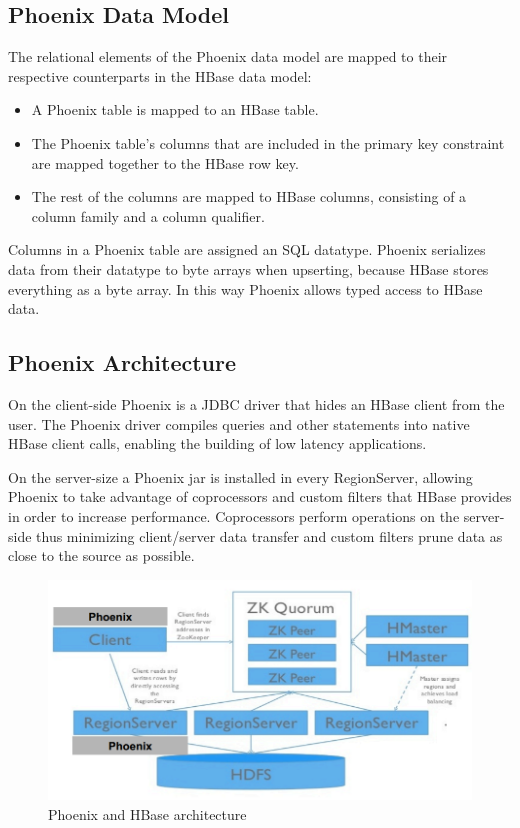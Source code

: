 \subsection{Phoenix Data Model}

The relational elements of the Phoenix data model are mapped to their respective counterparts in the HBase data model:

\begin{itemize}
\item A Phoenix table is mapped to an HBase table.
\item The Phoenix table's columns that are included in the primary key constraint are mapped together to the HBase row key.
\item The rest of the columns are mapped to HBase columns, consisting of a column family and a column qualifier.
\end{itemize}

Columns in a Phoenix table are assigned an SQL datatype. Phoenix serializes data from their datatype to byte arrays when upserting, because HBase stores everything as a byte array. In this way Phoenix allows typed access to HBase data.

\subsection{Phoenix Architecture}

On the client-side Phoenix is a JDBC driver that hides an HBase client from the user. The Phoenix driver compiles queries and other statements into native HBase client calls, enabling the building of low latency applications.

On the server-size a Phoenix jar is installed in every RegionServer, allowing Phoenix to take advantage of coprocessors and custom filters that HBase provides in order to increase performance. Coprocessors perform operations on the server-side thus minimizing client/server data transfer and custom filters prune data as close to the source as possible.

\begin{figure}[H]
\centering
\includegraphics[width=1\textwidth]{figures/phoenix_architecture}
\caption{Phoenix and HBase architecture}
\label{figure:phoenix_architecture}
\end{figure}

